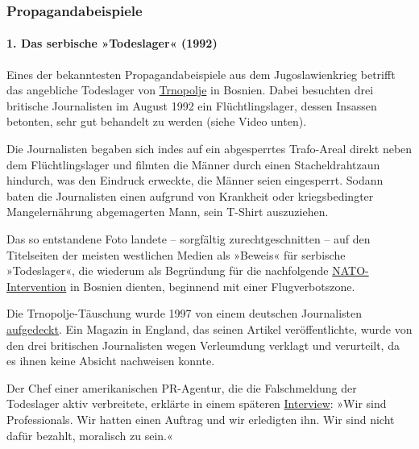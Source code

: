\hypertarget{propagandabeispiele}{%
\subsubsection{Propagandabeispiele}\label{propagandabeispiele}}

\hypertarget{1-das-serbische-todeslager-1992}{%
\paragraph{1. Das serbische »Todeslager«
(1992)}\label{1-das-serbische-todeslager-1992}}

Eines der bekanntesten Propagandabeispiele aus dem Jugoslawienkrieg
betrifft das angebliche Todeslager von
\href{https://en.wikipedia.org/wiki/Trnopolje_camp}{Trnopolje} in
Bosnien. Dabei besuchten drei britische Journalisten im August 1992 ein
Flüchtlingslager, dessen Insassen betonten, sehr gut behandelt zu werden
(siehe Video unten).

Die Journalisten begaben sich indes auf ein abgesperrtes Trafo-Areal
direkt neben dem Flüchtlings­lager und filmten die Männer durch einen
Stachel­draht­zaun hindurch, was den Eindruck erweckte, die Männer seien
eingesperrt. Sodann baten die Journalisten einen aufgrund von Krankheit
oder kriegsbedingter Mangelernährung abgemagerten Mann, sein T-Shirt
auszuziehen.

Das so entstandene Foto landete -- sorgfältig zurecht­geschnitten -- auf
den Titelseiten der meisten westlichen Medien als »Beweis« für serbische
»Todeslager«, die wiederum als Begründung für die nachfolgende
\href{https://en.wikipedia.org/wiki/NATO_intervention_in_Bosnia_and_Herzegovina}{NATO-Intervention}
in Bosnien dienten, beginnend mit einer Flugverbotszone.

Die Trnopolje-Täuschung wurde 1997 von einem deutschen Journalisten
\href{https://www.novo-argumente.com/artikel/es_war_dieses_bild_das_die_welt_in_alarmbereitschaft_versetzte_penny_marsha}{aufgedeckt}.
Ein Magazin in England, das seinen Artikel veröffentlichte, wurde von
den drei britischen Journalisten wegen Verleumdung verklagt und
verurteilt, da es ihnen keine Absicht nachweisen konnte.

Der Chef einer amerikanischen PR-Agentur, die die Falschmeldung der
Todeslager aktiv verbreitete, erklärte in einem späteren
\href{https://www.sourcewatch.org/index.php/James_Harff}{Interview}:
»Wir sind Professionals. Wir hatten einen Auftrag und wir erledigten
ihn. Wir sind nicht dafür bezahlt, moralisch zu sein.«

